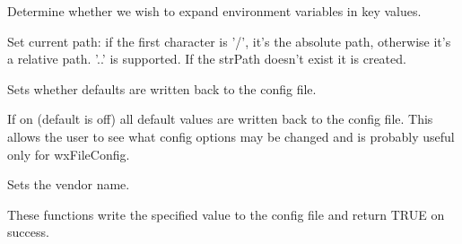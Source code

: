 
Determine whether we wish to expand environment variables in key values.

\label{wxconfigbasesetpath}


Set current path: if the first character is '/', it's the absolute path,
otherwise it's a relative path. '..' is supported. If the strPath
doesn't exist it is created.

\label{wxconfigbasesetrecorddefaults}


Sets whether defaults are written back to the config file.

If on (default is off) all default values are written back to the config file. This allows
the user to see what config options may be changed and is probably useful only
for wxFileConfig.

\label{wxconfigbasesetvendorname}


Sets the vendor name.

\label{wxconfigbasewrite}





These functions write the specified value to the config file and
return TRUE on success.


